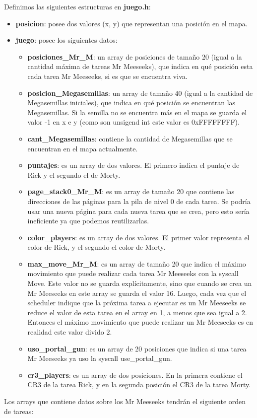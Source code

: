 \documentclass[a4paper]{article}
\begin{document}
\justify
Definimos las siguientes estructuras en \textbf{juego.h}:
\begin{itemize}
	\item \textbf{posicion}: posee dos valores (x, y) que representan una posición en el mapa.
	\item \textbf{juego}: posee los siguientes datos:
	\begin{itemize}
		\item \textbf{posiciones_Mr_M}: un array de posiciones de tamaño 20 (igual a la cantidad máxima de tareas Mr Meeseeks), que indica en qué posición esta cada tarea Mr Meeseeks, si es que se encuentra viva.
		\item \textbf{posicion_Megasemillas}: un array de tamaño 40 (igual a la cantidad de Megasemillas iniciales), que indica en qué posición se encuentran las Megasemillas. Si la semilla no se encuentra más en el mapa se guarda el valor -1 en x e y (como son unsigend int este valor es 0xFFFFFFFF).
		\item \textbf{cant_Megasemillas}: contiene la cantidad de Megasemillas que se encuentran en el mapa actualmente.
		\item \textbf{puntajes}: es un array de dos valores. El primero indica el puntaje de Rick y el segundo el de Morty.
		\item \textbf{page_stack0_Mr_M}: es un array de tamaño 20 que contiene las direcciones de las páginas para la pila de nivel 0 de cada tarea. Se podría usar una nueva página para cada nueva tarea que se crea, pero esto sería ineficiente ya que podemos reutilizarlas.
		\item \textbf{color_players}: es un array de dos valores. El primer valor representa el color de Rick, y el segundo el color de Morty.
		\item \textbf{max_move_Mr_M}: es un array de tamaño 20 que  indica el máximo movimiento que puede realizar cada tarea Mr Meeseeks con la syscall Move. Este valor no se guarda explícitamente, sino que cuando se crea un Mr Meeseeks en este array se guarda el valor 16. Luego, cada vez que el scheduler indique que la próxima tarea a ejecutar es un Mr Meeseeks se reduce el valor de esta tarea en el array en 1, a menos que sea igual a 2. Entonces el máximo movimiento que puede realizar un Mr Meeseeks es en realidad este valor divido $2$.
		\item \textbf{uso_portal_gun}: es un array de 20 posiciones que indica si una tarea Mr Meeseeks ya uso la syscall use_portal_gun.
		\item \textbf{cr3_players}: es un array de dos posiciones. En la primera contiene el CR3 de la tarea Rick, y en la segunda posición el CR3 de la tarea Morty.
	\end{itemize}
\end{itemize}
Los arrays que contiene datos sobre los Mr Meeseeks tendrán el siguiente orden de tareas:
\end{document}
